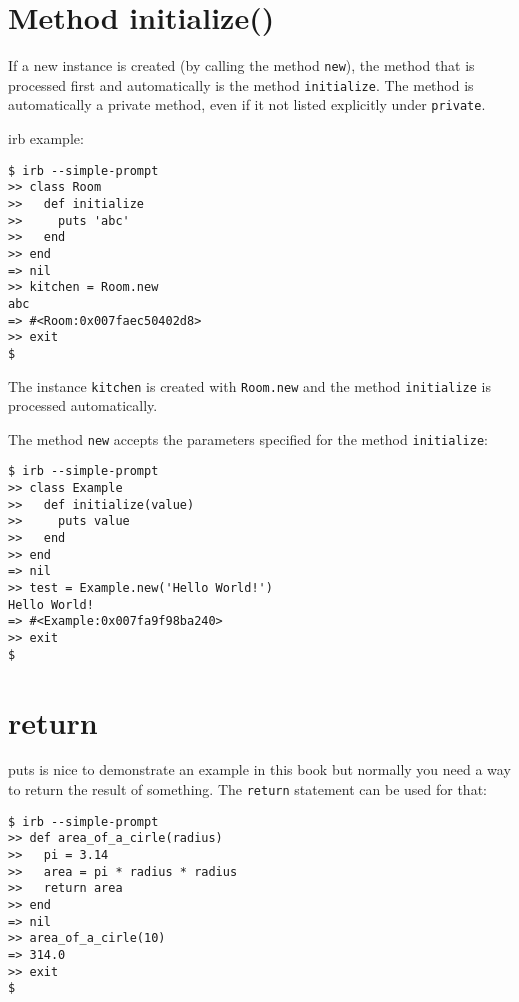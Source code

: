 \documentclass[a4paper]{book}
\begin{document}
\section{Method initialize()}\label{method-initialize}

If a new instance is created (by calling the method \texttt{new}), the method that is processed first and automatically is the method \texttt{initialize}. The method is automatically a private method, even if it not listed explicitly under \texttt{private}.

irb example:

\begin{shaded}\begin{verbatim}
$ irb --simple-prompt
>> class Room
>>   def initialize
>>     puts 'abc'
>>   end
>> end
=> nil
>> kitchen = Room.new
abc
=> #<Room:0x007faec50402d8>
>> exit
$
\end{verbatim}\end{shaded}

The instance \texttt{kitchen} is created with \texttt{Room.new} and the method \texttt{initialize} is processed automatically.

The method \texttt{new} accepts the parameters specified for the method \texttt{initialize}:

\begin{shaded}\begin{verbatim}
$ irb --simple-prompt
>> class Example
>>   def initialize(value)
>>     puts value
>>   end
>> end
=> nil
>> test = Example.new('Hello World!')
Hello World!
=> #<Example:0x007fa9f98ba240>
>> exit
$
\end{verbatim}\end{shaded}

\section{return}\label{return}

puts is nice to demonstrate an example in this book but normally you need a way to return the result of something. The \texttt{return} statement can be used for that:

\begin{shaded}\begin{verbatim}
$ irb --simple-prompt
>> def area_of_a_cirle(radius)
>>   pi = 3.14
>>   area = pi * radius * radius
>>   return area
>> end
=> nil
>> area_of_a_cirle(10)
=> 314.0
>> exit
$
\end{verbatim}\end{shaded}
\end{document}

